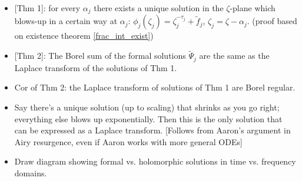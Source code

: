 \documentclass{article}
\theoremstyle{definition}
\newcommand{\laplace}{\mathcal{L}}
\newcommand{\borel}{\mathcal{B}}
\begin{document}
\begin{itemize}
\item {[Thm 1]}: for every $\alpha_j$ there exists a unique solution in the $\zeta$-plane which blows-up in a certain way at $\alpha_j$: ${\phi}_j(\zeta_j)=\zeta_j^{-\tau_j}+\tilde{f}_j$, $\zeta_j=\zeta-\alpha_j$. (proof based on existence theorem \ref{frac_int_exist})
\item {[Thm 2]}: The Borel sum of the formal solutions $\tilde{\Psi}_j$ are the same as the Laplace transform of the solutions of Thm 1. 
\item Cor of Thm 2: the Laplace transform of solutions of Thm 1 are Borel regular.   
\item Say there's a unique solution (up to scaling) that shrinks as you go right; everything else blows up exponentially. Then this is the only solution that can be expressed as a Laplace transform. [Follows from Aaron's argument in Airy resurgence, even if Aaron works with more general ODEs]

\item Draw diagram showing formal vs. holomorphic solutions in time vs. frequency domains.

\begin{center}
\end{center}


\end{itemize}
\end{document}
